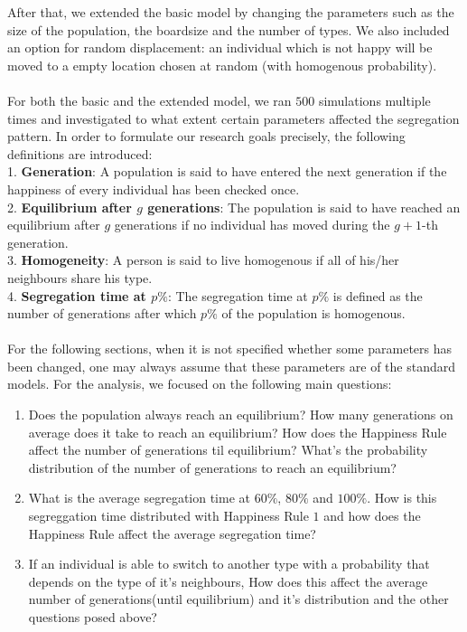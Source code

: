 After that, we extended the basic model by changing the parameters such as the size of the population, the boardsize and the number of types. 
We also included an option for random displacement: an individual which is not happy will be moved to a empty location chosen at random (with homogenous probability).\\
\\
For both the basic and the extended model, we ran $500$ simulations multiple times and investigated to what extent certain parameters affected the segregation pattern. 
In order to formulate our research goals precisely, the following definitions are introduced:\\
1. \textbf{Generation}: 
A population is said to have entered the next generation if the happiness of every individual has been checked once. \\
2. \textbf{Equilibrium after \(g\) generations}: 
The population is said to have reached an equilibrium after \(g\) generations if no individual has moved during the \(g+1\)-th generation.\\
3. \textbf{Homogeneity}:
A person is said to live homogenous if all of his/her neighbours share his type.\\
4. \textbf{Segregation time at $p\%$}: 
The segregation time at $p\%$ is defined as the number of generations after which $p\%$ of the population is homogenous.\\
\\
For the following sections, when it is not specified whether some parameters has been changed, one may always assume that these parameters are of the standard models.
\newpage
For the analysis, we focused on the following main questions:
\begin{enumerate}
	\item 	Does the population always reach an equilibrium? 
	How many generations on average does it take to reach an equilibrium? 
	How does the Happiness Rule affect the number of generations til equilibrium? 
	What's the probability distribution of the number of generations to reach an equilibrium?

	\item What is the average segregation time at \(60\%\), \(80\%\) and \(100\%\). 
	How is this segreggation time distributed with Happiness Rule \(1\) and how does the Happiness Rule affect the average segregation time?
	
	\item If an individual is able to switch to another type with a probability that depends on the type of it's neighbours,
	How does this affect the average number of generations(until equilibrium) and it's distribution and the other questions posed above?
\end{enumerate}

